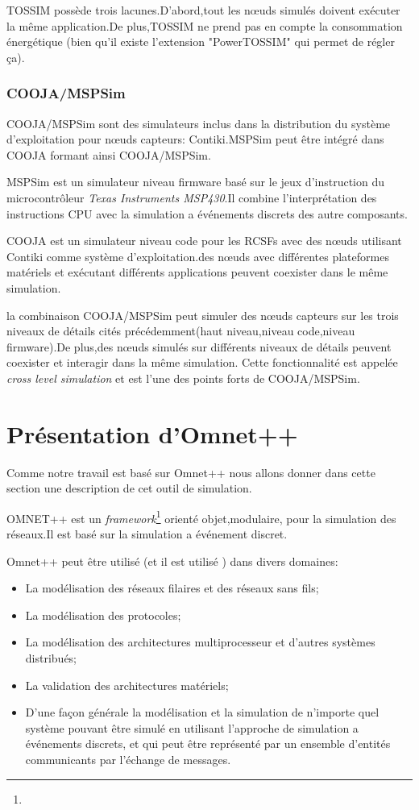 TOSSIM possède trois lacunes.D'abord,tout les nœuds simulés doivent exécuter la même application.De plus,TOSSIM ne prend pas en compte la consommation énergétique (bien qu'il existe l'extension "PowerTOSSIM" qui permet de régler ça).

\subsubsection{COOJA/MSPSim}
COOJA/MSPSim sont des simulateurs inclus dans la distribution du système d'exploitation pour nœuds capteurs: Contiki.MSPSim peut être intégré dans COOJA formant ainsi COOJA/MSPSim.

MSPSim est un simulateur niveau firmware basé sur le jeux d'instruction du microcontrôleur \emph{Texas Instruments MSP430}.Il combine l'interprétation des instructions CPU avec la simulation a événements discrets des autre composants.

COOJA est un simulateur niveau code pour les RCSFs avec des nœuds utilisant Contiki comme système d'exploitation.des nœuds avec différentes  plateformes matériels et exécutant différents applications peuvent coexister dans le même simulation.

la combinaison COOJA/MSPSim peut simuler des nœuds capteurs sur les trois niveaux de détails cités précédemment(haut niveau,niveau code,niveau firmware).De plus,des nœuds simulés sur différents niveaux de détails peuvent coexister et interagir dans la même simulation. 
Cette fonctionnalité est appelée \emph{cross level simulation} et est l'une des points forts de COOJA/MSPSim.

\section{Présentation d'Omnet++}
Comme notre travail est basé sur Omnet++ nous allons donner dans cette section une description de cet outil de simulation.

OMNET++ est un \emph{framework}\footnote{} orienté objet,modulaire, pour la simulation des réseaux.Il est basé sur la simulation a événement discret.

Omnet++ peut être utilisé (et il est utilisé ) dans divers domaines:
\begin{itemize}
\item La modélisation des réseaux filaires et des réseaux sans fils; 
\item La modélisation des protocoles;
\item La modélisation des architectures multiprocesseur et d'autres systèmes distribués;
\item La validation des architectures matériels;
\item D'une façon générale la modélisation et la simulation de n'importe quel système pouvant être simulé en utilisant l'approche de simulation a événements discrets, et qui peut être représenté par un ensemble d'entités communicants par l'échange de messages.
\end{itemize}

